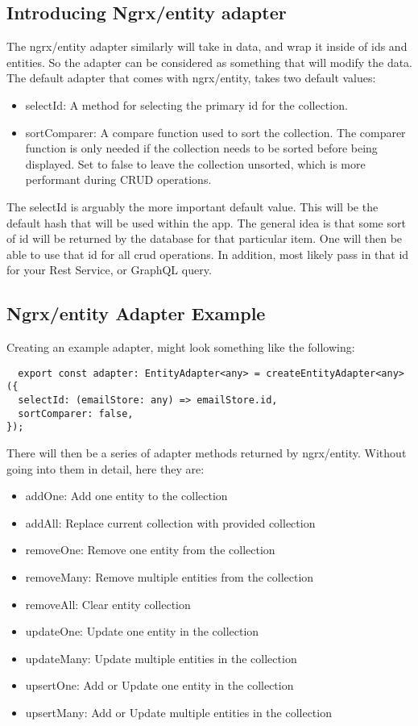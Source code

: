 \subsection{ Introducing Ngrx/entity adapter }
The ngrx/entity adapter similarly will take in data, and wrap it inside of ids
and entities. So the adapter can be considered as something that will modify
the data. The default adapter that comes with ngrx/entity, takes two default
values:
\begin{itemize}
  \item selectId: A method for selecting the primary id for the collection.
  \item sortComparer: A compare function used to sort the collection. The
  comparer function is only needed if the collection needs to be sorted before
  being displayed. Set to false to leave the collection unsorted, which is more
  performant during CRUD operations.
\end{itemize}

The selectId is arguably the more important default value. This will be the
default hash that will be used within the app. The general idea is that some
sort of id will be returned by the database for that particular item. One will
then be able to use that id for all crud operations. In addition, most likely
pass in that id for your Rest Service, or GraphQL query.

\subsection{ Ngrx/entity Adapter Example }
Creating an example adapter, might look something like the following:
\begin{verbatim}
  export const adapter: EntityAdapter<any> = createEntityAdapter<any>({
  selectId: (emailStore: any) => emailStore.id,
  sortComparer: false,
});
\end{verbatim}

There will then be a series of adapter methods returned by ngrx/entity. Without
going into them in detail, here they are:
\begin{itemize}
  \item addOne: Add one entity to the collection
  \item addAll: Replace current collection with provided collection
  \item removeOne: Remove one entity from the collection
  \item removeMany: Remove multiple entities from the collection
  \item removeAll: Clear entity collection
  \item updateOne: Update one entity in the collection
  \item updateMany: Update multiple entities in the collection
  \item upsertOne: Add or Update one entity in the collection
  \item upsertMany: Add or Update multiple entities in the collection
\end{itemize}
